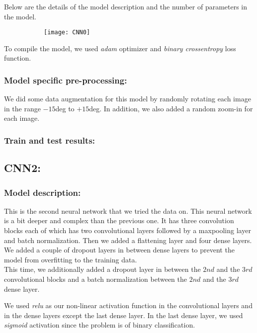 \documentclass{scrreprt}
\begin{document}
Below are the details of the model description and the number of parameters in the model.

\begin{figure}[b]
\begin{subfigure}{0.5\textwidth}
\texttt{[image: CNN0]}
\end{subfigure}
\end{figure}


To compile the model, we used \textit{adam} optimizer and \textit{binary crossentropy} loss function.

\subsubsection{Model specific pre-processing:}
We did some data augmentation for this model by randomly rotating each image in the range $-15$deg to $+15$deg. In addition, we also added a random zoom-in for each image.

\subsubsection{Train and test results:}

\subsection{CNN2:}

\subsubsection{Model description:}
This is the second neural network that we tried the data on. This neural network is a bit deeper and complex than the previous one. It has three convolution blocks each of which has two convolutional layers followed by a maxpooling layer and batch normalization. Then we added a flattening layer and four dense layers. We added a couple of dropout layers in between dense layers to prevent the model from overfitting to the training data.\\

This time, we additionally added a dropout layer in between the $2nd$ and the $3rd$ convolutional blocks and a batch normalization between the $2nd$ and the $3rd$ dense layer.

We used \textit{relu} as our non-linear activation function in the convolutional layers and in the dense layers except the last dense layer. In the last dense layer, we used \textit{sigmoid} activation since the problem is of binary classification.
\end{document}
